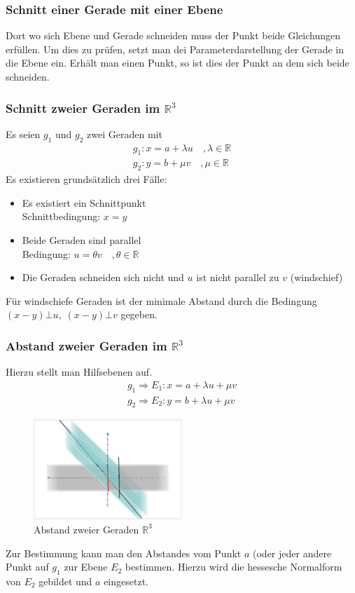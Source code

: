 \documentclass[12pt,a4paper]{report}%
\numberwithin{equation}{section}
\newcommand{\R}{\mathbb{R}} %
\numberwithin{equation}{subsection}
\begin{document}
	  \subsubsection{Schnitt einer Gerade mit einer Ebene}
	  Dort wo sich Ebene und Gerade schneiden muss der Punkt beide Gleichungen erfüllen. Um dies zu prüfen, setzt man dei Parameterdarstellung der Gerade in die Ebene ein. Erhält man einen Punkt, so ist dies der Punkt an dem sich beide schneiden.
	  \subsubsection{Schnitt zweier Geraden im $\R^3$}
	  Es seien $g_1$ und $g_2$ zwei Geraden mit
	  \begin{align*}
	    g_1: x = a + \lambda u \quad, \lambda \in \R\\
	    g_2: y = b + \mu v \quad, \mu \in \R
	  \end{align*}
	  Es existieren grundsätzlich drei Fälle:
	  \begin{itemize}
	    \item Es existiert ein Schnittpunkt \\
	      Schnittbedingung: $x = y$
	    \item Beide Geraden sind parallel \\
	      Bedingung: $u = \theta v \quad, \theta \in \R$
	    \item Die Geraden schneiden sich nicht und $u$ ist nicht parallel zu $v$ (windschief)
	  \end{itemize}
	  Für windschiefe Geraden ist der minimale Abstand durch die Bedingung $(x-y) \bot u,\; (x-y) \bot v$ gegeben.
	  \subsubsection{Abstand zweier Geraden im $\R^3$}
	  Hierzu stellt man Hilfsebenen auf.
	  \begin{align*}
	    g_1 \Rightarrow E_1: x = a + \lambda u + \mu v \\
	    g_2 \Rightarrow E_2: y = b + \lambda u + \mu v
	  \end{align*}
	  \begin{figure}[H] 
		  \centering
		  \includegraphics[width=0.5\textwidth]{Abstand_Geraden.png}
		  \caption{Abstand zweier Geraden $\R^3$}
		  \label{fig:abstand_geraden}
	  \end{figure}
	  Zur Bestimmung kann man den Abstandes vom Punkt $a$ (oder jeder andere Punkt auf $g_1$ zur Ebene $E_2$ bestimmen. Hierzu wird die hessesche Normalform von $E_2$ gebildet und $a$ eingesetzt.
\newpage
\end{document}
